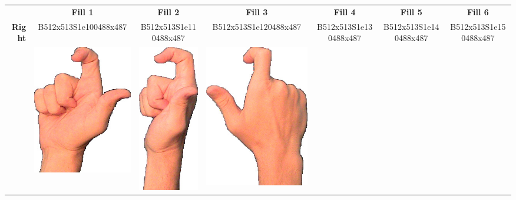 \documentclass{article}
\begin{document}
\begin{center}
\begin{tabular}{r*{6}{c}}
&\textbf{Fill 1}&\textbf{Fill 2}&\textbf{Fill 3}&\textbf{Fill 4}&\textbf{Fill 5}&\textbf{Fill 6}\\
\multirow{2}{*}{\textbf{Right}}&
B512x513S1e100488x487&
B512x513S1e110488x487&
B512x513S1e120488x487&
B512x513S1e130488x487&
B512x513S1e140488x487&
B512x513S1e150488x487\\
&
\includegraphics[scale=0.1]{images/09-05-1.jpg}&
\includegraphics[scale=0.1]{images/09-05-2.jpg}&
\includegraphics[scale=0.1]{images/09-05-3.jpg}&

\end{tabular}
\end{center}
\end{document}
